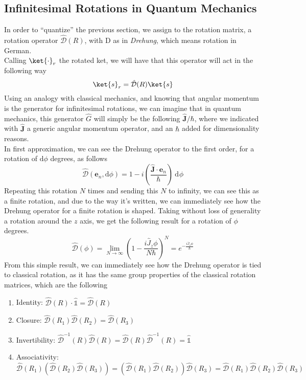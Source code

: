 \documentclass[a4paper, 11pt]{book}
\renewcommand{\vec}[1]{\mathbf{#1}}
\newcommand{\ver}[1]{\vec{e}_{#1}}
\newcommand{\1}{\opr{\mathds{1}}}
\newcommand{\diff}[2][]{\ \mathrm{d}^{#1}#2}
\newcommand{\opr}[1]{\hat{#1}}
\newcommand{\mc}[1]{\mathcal{#1}}
\theoremstyle{plain}
\begin{document}
	\subsection{Infinitesimal Rotations in Quantum Mechanics}
	In order to ``quantize'' the previous section, we assign to the rotation matrix, a rotation operator $\opr{\mc{D}}(R)$, with D as in \textit{Drehung}, which means rotation in German.\\
	Calling $\ket{\cdot}_r$ the rotated ket, we will have that this operator will act in the following way
	\begin{equation}
		\ket{s}_r=\opr{\mc{D}}(R)\ket{s}
		\label{eq:drehungop}
	\end{equation}
	Using an analogy with classical mechanics, and knowing that angular momentum is the generator for infinitesimal rotations, we can imagine that in quantum mechanics, this generator $\opr{G}$ will simply be the following $\opr{\vec{J}}/\hbar$, where we indicated with $\opr{\vec{J}}$ a generic angular momentum operator, and an $\hbar$ added for dimensionality reasons.\\
	In first approximation, we can see the Drehung operator to the first order, for a rotation of $\mathrm{d}\phi$ degrees, as follows
	\begin{equation*}
		\opr{\mc{D}}(\ver{n},\mathrm{d}\phi)=1-i\left( \frac{\opr{\vec{J}}\cdot\ver{n}}{\hbar} \right)\diff{\phi}
	\end{equation*}
	Repeating this rotation $N$ times and sending this $N$ to infinity, we can see this as a finite rotation, and due to the way it's written, we can immediately see how the Drehung operator for a finite rotation is shaped. Taking without loss of generality a rotation around the $z$ axis, we get the following result for a rotation of $\phi$ degrees.
	\begin{equation}
		\opr{\mc{D}}(\phi)=\lim_{N\to\infty}\left( 1-\frac{i\opr{J}_z\phi}{N\hbar} \right)^N=e^{-\frac{i\opr{J}_z\phi}{\hbar}}
		\label{eq:finitedrehungop}
	\end{equation}
	From this simple result, we can immediately see how the Drehung operator is tied to classical rotation, as it has the same group properties of the classical rotation matrices, which are the following
	\begin{enumerate}
	\item Identity: $\opr{\mc{D}}(R)\cdot\1=\opr{\mc{D}}(R)$
	\item Closure: $\opr{\mc{D}}(R_1)\opr{\mc{D}}(R_2)=\opr{\mc{D}}(R_3)$
	\item Invertibility: $\opr{\mc{D}}^{-1}(R)\opr{\mc{D}}(R)=\opr{\mc{D}}(R)\opr{\mc{D}}^{-1}(R)=\1$
	\item Associativity: $\opr{\mc{D}}(R_1)\left( \opr{\mc{D}}(R_2)\opr{\mc{D}}(R_3) \right)=\left( \opr{\mc{D}}(R_1)\opr{\mc{D}}(R_2) \right)\opr{\mc{D}}(R_3)=\opr{\mc{D}}(R_1)\opr{\mc{D}}(R_2)\opr{\mc{D}}(R_3)$
	\end{enumerate}
\end{document}
